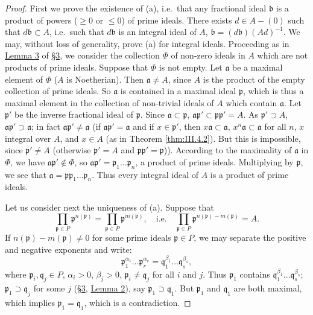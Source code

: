 \begin{proof}
First we prove the existence of (a), i.e.\ that any fractional ideal
$\mathfrak{b}$ is a product of powers ($\geq0$ or $\leq0$) of prime ideals.
There exists $d\in A-(0)$ such that $d\mathfrak{b}\subset A$, i.e.\ such that
$d\mathfrak{b}$ is an integral ideal of $A$,
$\mathfrak{b}=(d\mathfrak{b})(Ad)^{-1}$. We may, without loss of
generality, prove (a) for integral ideals. Proceeding as in \hyperref[lem:III.3.3]{Lemma 3} of \hyperref[sec:3.3]{§3}, we
consider the collection $\Phi$ of non-zero ideals in $A$ which are not
products of prime ideals. Suppose that $\Phi$ is not empty. Let
$\mathfrak{a}$ be a maximal element of $\Phi$ ($A$ is Noetherian). Then
$\mathfrak{a}\neq A$, since $A$ is the product of the empty collection of
prime ideals. So $\mathfrak{a}$ is contained in a maximal ideal
$\mathfrak{p}$, which is thus a maximal element in the collection of
non-trivial ideals of $A$ which contain $\mathfrak{a}$. Let
$\mathfrak{p}'$ be the inverse fractional ideal of $\mathfrak{p}$. Since
$\mathfrak{a}\subset\mathfrak{p}$,
$\mathfrak{a}\mathfrak{p}'\subset\mathfrak{p}\mathfrak{p}'=A$. As
$\mathfrak{p}'\supset A$, $\mathfrak{a}\mathfrak{p}'\supset\mathfrak{a}$; in
fact $\mathfrak{a}\mathfrak{p}'\neq\mathfrak{a}$ (if
$\mathfrak{a}\mathfrak{p}'=\mathfrak{a}$ and if
$x\in\mathfrak{p}'$, then $x\mathfrak{a}\subset\mathfrak{a}$,
$x^{n}\mathfrak{a}\subset\mathfrak{a}$ for all $n$, $x$ integral over $A$,
and $x\in A$ (as in Theorem \ref{thm:III.4.2}). But this is impossible,
since $\mathfrak{p}'\neq A$ (otherwise $\mathfrak{p}'=A$ and
$\mathfrak{p}\mathfrak{p}'=\mathfrak{p}$)). According to the maximality of
$\mathfrak{a}$ in $\Phi$, we have $\mathfrak{a}\mathfrak{p}'\notin\Phi$, so
$\mathfrak{a}\mathfrak{p}'=\mathfrak{p}_{1}\ldots\mathfrak{p}_{n}$, a
product of prime ideals. Multiplying by $\mathfrak{p}$, we see that
$\mathfrak{a}=\mathfrak{p}\mathfrak{p}_{1}\ldots\mathfrak{p}_{n}$. Thus every
integral ideal of $A$ is a product of prime ideals.

Let us consider next the uniqueness of (a). Suppose that
\begin{equation}
\prod_{\mathfrak{p}\in P}\mathfrak{p}^{n(\mathfrak{p})}
=\prod_{\mathfrak{p}\in P}\mathfrak{p}^{m(\mathfrak{p})},
\quad\text{i.e.}\quad
\prod_{\mathfrak{p}\in P}\mathfrak{p}^{n(\mathfrak{p})-m(\mathfrak{p})}=A.
\label{eq:III.4.5}
\end{equation}
If $n(\mathfrak{p})-m(\mathfrak{p})\neq0$ for some prime ideals
$\mathfrak{p}\in P$, we may separate the positive and negative exponents and
write:
\[
\mathfrak{p}_{1}^{\alpha_{1}}\ldots\mathfrak{p}_{r}^{\alpha_{r}}
=\mathfrak{q}_{1}^{\beta_{1}}\ldots\mathfrak{q}_{s}^{\beta_{s}},
\]
where $\mathfrak{p}_{i},\mathfrak{q}_{j}\in P$, $\alpha_{i}>0$,
$\beta_{j}>0$, $\mathfrak{p}_{i}\neq\mathfrak{q}_{j}$ for all $i$ and $j$.
Thus $\mathfrak{p}_{1}$ contains
$\mathfrak{q}_{1}^{\beta_{1}}\ldots\mathfrak{q}_{s}^{\beta_{s}}$;
$\mathfrak{p}_{1}\supset\mathfrak{q}_{j}$ for some $j$ (\hyperref[sec:3.3]{§3}, \hyperref[lem:III.3.2]{Lemma 2}), say
$\mathfrak{p}_{1}\supset\mathfrak{q}_{1}$. But $\mathfrak{p}_{1}$ and
$\mathfrak{q}_{1}$ are both maximal, which implies
$\mathfrak{p}_{1}=\mathfrak{q}_{1}$, which is a contradiction.


\end{proof}
